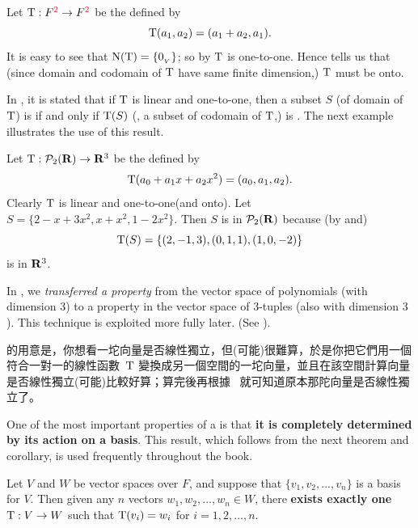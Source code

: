 \begin{example} \label{example 2.1.12}
Let \(\T : F^{\RED{2}} \to F^{\RED{2}}\) be the \LTRAN{} defined by
\[
    \mathrm{T}(a_1, a_2) = (a_1 + a_2, a_1).
\]
It is easy to see that \(\mathrm{N(T)} = \{ 0_{_V} \}\);
so by  \(\mathrm{T}\) is one-to-one.
Hence  tells us that (since domain and codomain of \(\mathrm{T}\) have same finite dimension,) \(\mathrm{T}\) must be onto.
\end{example}

\begin{note}
In , it is stated that if \(\mathrm{T}\) is linear and one-to-one, then a subset \(S\) (of domain of \(\mathrm{T}\)) is \LID{} if and only if \(\mathrm{T}(S)\) (, a subset of codomain of \(\mathrm{T}\),) is \LID{}.
The next example illustrates the use of this result.
\end{note}

\begin{example} \label{example 2.1.13}
Let \(\mathrm{T} : \mathcal{P}_2(\mathbf{R}) \to \mathbf{R}^3\) be the \LTRAN{} defined by
\[
    \mathrm{T}(a_0 + a_1 x + a_2 x^2) = (a_0, a_1, a_2).
\]
Clearly \(\mathrm{T}\) is linear and one-to-one(and onto).
Let \(S = \{ 2 - x + 3x^2, x + x^2, 1 - 2x^2 \}\).
Then \(S\) is \LID{} in \(\mathcal{P}_2(\mathbf{R})\) because (by  and)
\[
    \mathrm{T}(S) = \{ (2, -1, 3), (0, 1, 1), (1, 0, -2) \}
\]
is \LID{} in \(\mathbf{R}^3\).
\end{example}

\begin{remark} \label{remark 2.1.11}
In , we \emph{transferred a property} from the vector space of polynomials (with dimension \(3\)) to a property in the vector space of \(3\)-tuples (also with dimension \(3\)).
This technique is exploited more fully later.
(See ).
\end{remark}

\begin{note}
 的用意是，你想看一坨向量是否線性獨立，但(可能)很難算，於是你把它們用一個符合一對一的線性函數\ \(\mathrm{T}\) 變換成另一個空間的一坨向量，並且在該空間計算向量是否線性獨立(可能)比較好算；算完後再根據\  就可知道原本那陀向量是否線性獨立了。
\end{note}

One of the most important properties of a \LTRAN{} is that \textbf{it is completely determined by its action on a basis}.
This result, which follows from the next theorem and corollary, is used frequently throughout the book.

\begin{theorem} \label{thm 2.6}
Let \(V\) and \(W\) be vector spaces over \(F\), and suppose that \(\{ v_1, v_2, ..., v_n \}\) is a basis for \(V\).
Then given any \(n\) vectors \(w_1, w_2, ..., w_n \in W\), there \textbf{exists exactly one} \LTRAN{} \(\mathrm{T} : V \to W\) such that \(\mathrm{T}(v_i) = w_i\) for \(i= 1, 2, ..., n\).
\end{theorem}

